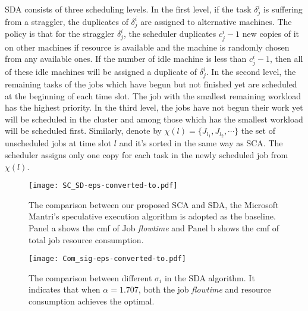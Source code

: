 \documentclass[10pt,conference]{IEEEtran}
\begin{document}
SDA consists of three scheduling levels. In the  first level, if the task $\delta^i_j$ is suffering from a straggler, the duplicates of $\delta^i_j$ are assigned to alternative machines. The policy is that for the straggler  $\delta^i_j$, the scheduler duplicates $c^i_j - 1$ new copies of it on other machines if resource is available and the machine is randomly chosen from any available ones. If the number of idle machine is less than $c^i_j - 1$, then all of these idle machines will be assigned a duplicate of $\delta^i_j$. In the second level, the remaining tasks of the jobs which have begun but not finished yet are scheduled at the beginning of each time slot. The job with the smallest remaining workload has the highest priority. In the third level, the jobs have not begun their work yet will be scheduled in the cluster and among those which has the smallest workload will be scheduled first. Similarly, denote by $\chi(l) =  \{J_{l_1}, J_{l_2}, \cdots\}$ the set of unscheduled jobs at time slot $l$ and it's sorted in the same way as SCA. The scheduler assigns only one copy for each task in the newly scheduled job from $\chi(l)$.


\begin{figure}
\centering
\texttt{[image: SC\_SD-eps-converted-to.pdf]}
\caption{The comparison between our proposed SCA and SDA, the Microsoft Mantri's speculative execution algorithm is adopted as the baseline.  Panel a shows the cmf of Job \textit{flowtime} and Panel b shows the cmf of total job resource consumption. }
\label{SDA}
\vspace{-0.2 cm}
\end{figure}

\begin{figure}
\centering
\texttt{[image: Com\_sig-eps-converted-to.pdf]}
\caption{The comparison between different $\sigma_i$ in the SDA algorithm. It indicates that when $\alpha = 1.707$, both the job \textit{flowtime} and resource consumption achieves the optimal.}
\label{comparison}
\vspace{-0.2 cm}
\end{figure}
\end{document}
